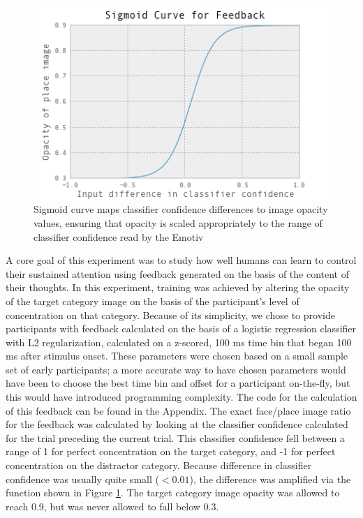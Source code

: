 \documentclass[12pt]{report}
\begin{document}
\begin{figure}[t]
\centering
\includegraphics[width=4.5in]{sigmoidcurve}
\caption{Sigmoid curve maps classifier confidence differences to image opacity values, ensuring that opacity is scaled appropriately to the range of classifier confidence read by the Emotiv\label{sigmoid}}
\end{figure}

	A core goal of this experiment was to study how well humans can learn to control their sustained attention using feedback generated on the basis of the content of their thoughts.  In this experiment, training was achieved by altering the opacity of the target category image on the basis of the participant's level of concentration on that category.  Because of its simplicity, we chose to provide participants with feedback calculated on the basis of a logistic regression classifier with L2 regularization, calculated on a z-scored, 100 ms time bin that began 100 ms after stimulus onset.  These parameters were chosen based on a small sample set of early participants; a more accurate way to have chosen parameters would have been to choose the best time bin and offset for a participant on-the-fly, but this would have introduced programming complexity.  The code for the calculation of this feedback can be found in the Appendix.  The exact face/place image ratio for the feedback was calculated by looking at the classifier confidence calculated for the trial preceding the current trial.  This classifier confidence fell between a range of 1 for perfect concentration on the target category, and -1 for perfect concentration on the distractor category.  Because difference in classifier confidence was usually quite small ($< 0.01$), the difference was amplified via the function shown in Figure \ref{sigmoid}.  The target category image opacity was allowed to reach 0.9, but was never allowed to fall below 0.3.  
\end{document}
